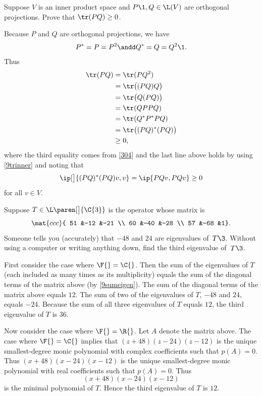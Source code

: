 \exercise
Suppose $V$ is an inner product space and $P\1, Q \in \L(V)$ are orthogonal projections. Prove that $\tr(PQ) \ge 0$.

\begin{Solution}
Because $P$ and $Q$ are orthogonal projections, we have
\[
P^* = P = P^2 \andd Q^* = Q = Q^2\1.
\]
Thus
\begin{align*}
\tr(PQ) &= \tr(P Q^2) \\
&= \tr\bigl( (P Q) Q\bigr) \\
&= \tr\bigl( Q (PQ)\bigr)\\
&= \tr( Q P P Q ) \\
&= \tr (Q^* P^* P Q )\\
&= \tr\bigl((PQ)^*(PQ)\bigr) \\
&\ge 0,
\end{align*}
where the third equality comes from \ref{304} and the last line above holds by using \ref{9trinner} and noting that
\[
\ip[\big]{(PQ)^*(PQ) v, v} = \ip{PQv, PQv} \ge 0
\]
for all $v \in V$.
\end{Solution}

\exercise
Suppose $T \in \L\paren[\big]{\C{3}}$ is the operator whose matrix is
\[
\mat{ccc}{
51 &-12 &-21 \\
60 &-40 &-28 \\
57 &-68 &1}.
\]
Someone tells you (accurately) that $-48$ and $24$ are eigenvalues of~$T\3$.
Without using a computer or writing anything down, find the third eigenvalue
of~$T\3$.

\begin{Solution}
First consider the case where $\F{} = \C{}$. Then the sum of the eigenvalues of $T$ (each included as many times as its multiplicity) equals the sum of the diagonal terms of the
matrix above (by \ref{9sumeigen}).  The sum of the diagonal terms of
the matrix above equals $12$.  The sum of two of the eigenvalues of $T$, $-48$
and $24$, equals $-24$.  Because the sum of all three eigenvalues of $T$
equals $12$, the third eigenvalue of $T$ is $36$.

Now consider the case where $\F{} = \R{}$. Let $A$ denote the matrix above. The case where $\F{} = \C{}$ implies that $(z+48)(z-24)(z-12)$ is the unique smallest-degree monic polynomial with complex coefficients such that $p(A) = 0$. Thus $(x+48)(x-24)(x-12)$ is the unique smallest-degree monic polynomial with real coefficients such that $p(A) = 0$. Thus
\[
(x+48)(x-24)(x-12)
\]
is the minimal polynomial of $T$. Hence the third eigenvalue of $T$ is $12$.
\end{Solution}

